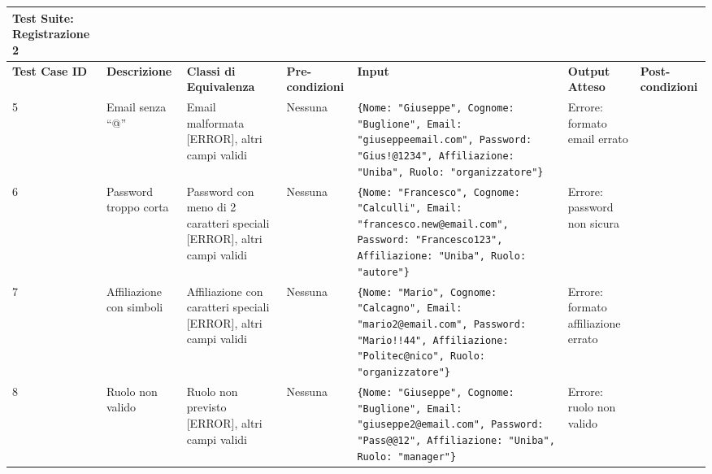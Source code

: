 \begin{sidewaystable}
\begin{tabular}{|p{3cm}|p{2cm}|p{2cm}|p{2cm}|p{4cm}|p{2cm}|p{2cm}|}
\hline
\rowcolor{SkyBlue}
\textbf{Test Suite: Registrazione 2} & & & & & &\\
\hline
\rowcolor{Red}
\textbf{Test Case ID} & \textbf{Descrizione} & \textbf{Classi di Equivalenza} & \textbf{Pre-condizioni} & \textbf{Input} & \textbf{Output Atteso} & \textbf{Post-condizioni} \\
\hline
5 & Email senza “@” & Email malformata [ERROR], altri campi validi & Nessuna & \texttt{\{Nome: "Giuseppe", Cognome: "Buglione", Email: "giuseppeemail.com", Password: "Gius!@1234", Affiliazione: "Uniba", Ruolo: "organizzatore"\}} & Errore: formato email errato & \\
\hline
6 & Password troppo corta & Password con meno di 2 caratteri speciali [ERROR], altri campi validi & Nessuna & \texttt{\{Nome: "Francesco", Cognome: "Calculli", Email: "francesco.new@email.com", Password: "Francesco123", Affiliazione: "Uniba", Ruolo: "autore"\}} & Errore: password non sicura & \\
\hline
7 & Affiliazione con simboli & Affiliazione con caratteri speciali [ERROR], altri campi validi & Nessuna & \texttt{\{Nome: "Mario", Cognome: "Calcagno", Email: "mario2@email.com", Password: "Mario!!44", Affiliazione: "Politec@nico", Ruolo: "organizzatore"\}} & Errore: formato affiliazione errato & \\
\hline
8 & Ruolo non valido & Ruolo non previsto [ERROR], altri campi validi & Nessuna & \texttt{\{Nome: "Giuseppe", Cognome: "Buglione", Email: "giuseppe2@email.com", Password: "Pass@@12", Affiliazione: "Uniba", Ruolo: "manager"\}} & Errore: ruolo non valido & \\
\hline
\end{tabular}
\end{sidewaystable}


